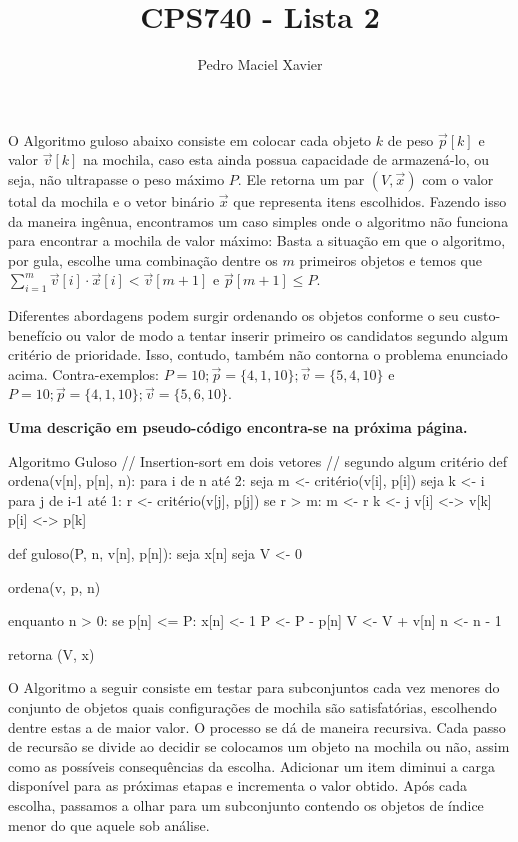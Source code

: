 \documentclass{homework}
\title{CPS740 - Lista 2}
\author{Pedro Maciel Xavier}
\begin{document}
	
	\maketitle
	
	\quest
	
	\subsubquest O Algoritmo guloso abaixo consiste em colocar cada objeto $k$ de peso $\vec{p}[k]$ e valor $\vec{v}[k]$ na mochila, caso esta ainda possua capacidade de armazená-lo, ou seja, não ultrapasse o peso máximo $P$. Ele retorna um par $(V, \vec{x})$ com o valor total da mochila e o vetor binário $\vec{x}$ que representa itens escolhidos. Fazendo isso da maneira ingênua, encontramos um caso simples onde o algoritmo não funciona para encontrar a mochila de valor máximo: Basta a situação em que o algoritmo, por gula, escolhe uma combinação dentre os $m$ primeiros objetos e temos que $\sum_{i=1}^{m} \vec{v}[i] \cdot \vec{x}[i] < \vec{v}[m + 1]$ e $\vec{p}[m + 1] \le P$.\par
	
	Diferentes abordagens podem surgir ordenando os objetos conforme o seu custo-benefício ou valor de modo a tentar inserir primeiro os candidatos segundo algum critério de prioridade. Isso, contudo, também não contorna o problema enunciado acima. Contra-exemplos: $P = 10; \vec{p} = \{4, 1, 10\}; \vec{v} = \{5, 4, 10\}$ e $P = 10; \vec{p} = \{4, 1, 10\}; \vec{v} = \{5, 6, 10\}$.\par
	
	\textbf{Uma descrição em pseudo-código encontra-se na próxima página.}
	
	\newpage
	
	\begin{algor}{Algoritmo Guloso}
	// Insertion-sort em dois vetores
	// segundo algum critério
	def ordena(v[n], p[n], n):
		para i de n até 2:
			seja m <- critério(v[i], p[i])
			seja k <- i
			para j de i-1 até 1:
				r <- critério(v[j], p[j])
				se r > m:
					m <- r
					k <- j
			v[i] <-> v[k]
			p[i] <-> p[k]
	
	def guloso(P, n, v[n], p[n]):
		seja x[n]
		seja V <- 0	
			
		ordena(v, p, n)

		enquanto n > 0:
			se p[n] <= P:
				x[n] <- 1
				P <- P - p[n]
				V <- V + v[n]
			n <- n - 1
			
		retorna (V, x)
		
	\end{algor}

	\newpage
	
	\subsubquest O Algoritmo a seguir consiste em testar para subconjuntos cada vez menores do conjunto de objetos quais configurações de mochila são satisfatórias, escolhendo dentre estas a de maior valor. O processo se dá de maneira recursiva. Cada passo de recursão se divide ao decidir se colocamos um objeto na mochila ou não, assim como as possíveis consequências da escolha. Adicionar um item diminui a carga disponível para as próximas etapas e incrementa o valor obtido. Após cada escolha, passamos a olhar para um subconjunto contendo os objetos de índice menor do que aquele sob análise.\par
	
\end{document}
